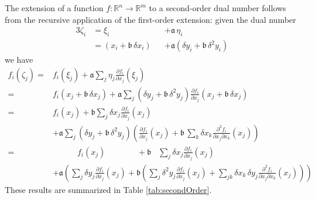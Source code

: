 The extension of a function $f: \mathbb{R}^{n} \rightarrow \mathbb{R}^{m}$ to
a second-order dual number follows from the recursive application of the
first-order extension: given the dual number
%
\begin{alignat*}{3}
\zeta_{i} 
&=
\xi_{i} 
&&+ \mathfrak{a} \, \eta_{i}
\\
&=
\left( x_{i} + \mathfrak{b} \, \delta x_{i} \right)
&&+ \mathfrak{a} \left( \delta y_{i} + \mathfrak{b} \, \delta^{2} y_{i} \right)
\end{alignat*}
%
we have
%
\begin{align*}
f_{i} \! \left( \zeta_{j} \right)
=&
f_{i} \! \left( \xi_{j} \right) 
+ \mathfrak{a} \sum_{j} \eta_{j} \frac{ \partial f_{i} }{ \partial x_{j} } \! \left( \xi_{j} \right) 
\\
=&
f_{i} \! \left( x_{j} + \mathfrak{b} \, \delta x_{j} \right) 
+ \mathfrak{a} \sum_{j} \left( \delta y_{j} + \mathfrak{b} \, \delta^{2} y_{j} \right)
\frac{ \partial f_{i} }{ \partial x_{j} } 
\! \left( x_{j} + \mathfrak{b} \, \delta x_{j} \right) 
\\
=&
f_{i} \! \left( x_{j} \right) 
+ \mathfrak{b} \sum_{j} \delta x_{j}  \frac{ \partial f_{i} }{ \partial x_{j} } \! \left( x_{j} \right)
\\
&+ 
\mathfrak{a} \sum_{j} \left( \delta y_{j} + \mathfrak{b} \, \delta^{2} y_{j} \right)
\left( \frac{ \partial f_{i} }{ \partial x_{j} } \! \left( x_{j} \right) + 
\mathfrak{b} \, \sum_{k} \delta x_{k} 
\frac{ \partial^{2} f_{i} }{ \partial x_{j} \partial x_{k} } \! \left( x_{j} \right) \right) 
\\
=&
\quad\quad\quad 
f_{i} \! \left( x_{j} \right) 
\quad\quad\quad\;\;\;
+ \mathfrak{b} \;\;\;
\sum_{j} \delta x_{j}  \frac{ \partial f_{i} }{ \partial x_{j} } \! \left( x_{j} \right)
\\
&+ 
\mathfrak{a} \left( 
\sum_{j} \delta y_{j} \frac{ \partial f_{i} }{ \partial x_{j} } \! \left( x_{j} \right) 
+ \mathfrak{b} \left(
\sum_{j} \delta^{2} y_{j} \frac{ \partial f_{i} }{ \partial x_{j} } \! \left( x_{j} \right)
+ \sum_{jk} \delta x_{k} \, \delta y_{j}
\frac{ \partial^{2} f_{i} }{ \partial x_{j} \partial x_{k} } \! \left( x_{j} \right)
\right)
\right)
\end{align*}
%
These results are summarized in Table \ref{tab:secondOrder}.

